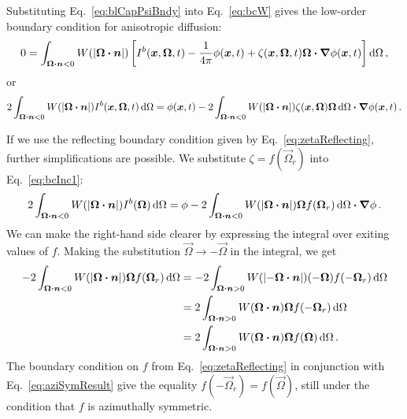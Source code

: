 Substituting Eq.~\eqref{eq:blCapPsiBndy} into Eq.~\eqref{eq:bcW} gives the
low-order boundary condition for anisotropic diffusion:
\begin{equation*}
  0 = \int_{\bm{\Omega} \bm{\cdot} \bm{n} < 0} W(\left| \bm{\Omega} \bm{\cdot} \bm{n} \right|)
  \left[  I^b(\bm{x}, \bm{\Omega}, t) - \frac{1}{4\pi} \phi(\bm{x}, t)
  + \zeta(\bm{x}, \bm{\Omega}, t) \bm{\Omega}\bm{\cdot} \bm{\nabla} \phi(\bm{x}, t)
\right] \mathop{}\!\mathrm{d} \Omega \,,
\end{equation*}
or
\begin{equation} \label{eq:bcInc1}
  2\int_{\bm{\Omega}\bm{\cdot} \bm{n} < 0}
  W(\left| \bm{\Omega} \bm{\cdot} \bm{n} \right|) I^b(\bm{x}, \bm{\Omega}, t) \mathop{}\!\mathrm{d}\Omega
  = \phi(\bm{x}, t)
  - 2\int_{\bm{\Omega}\bm{\cdot} \bm{n} < 0} W(\left| \bm{\Omega} \bm{\cdot} \bm{n} \right|)
  \zeta(\bm{x}, \bm{\Omega}) \bm{\Omega} \mathop{}\!\mathrm{d}\Omega
  \bm{\cdot} \bm{\nabla} \phi(\bm{x}, t) \,.
\end{equation}

If we use the reflecting boundary condition given by
Eq.~\eqref{eq:zetaReflecting}, further simplifications are possible. We
substitute $\zeta = f(\vec{\Omega}_r)$ into Eq.~\eqref{eq:bcInc1}:
\begin{equation*}
  2\int_{\bm{\Omega}\bm{\cdot} \bm{n} < 0}
  W(\left| \bm{\Omega} \bm{\cdot} \bm{n} \right|) I^b(\bm{\Omega}) \mathop{}\!\mathrm{d}\Omega
  = \phi
  - 2\int_{\bm{\Omega}\bm{\cdot} \bm{n} < 0} W(\left| \bm{\Omega} \bm{\cdot} \bm{n} \right|)
  \bm{\Omega} f(\bm{\Omega}_r) \mathop{}\!\mathrm{d}\Omega
  \bm{\cdot} \bm{\nabla} \phi \,.
\end{equation*}
We can make the right-hand side clearer by expressing the integral over exiting
values of $f$. Making the substitution $\vec{\Omega}\to-\vec{\Omega}$ in the
integral, we get
\begin{align*}
  - 2\int_{\bm{\Omega}\bm{\cdot} \bm{n} < 0} W(\left| \bm{\Omega} \bm{\cdot} \bm{n} \right|)
  \bm{\Omega} f(\bm{\Omega}_r) \mathop{}\!\mathrm{d}\Omega
  &= 
  - 2\int_{\bm{\Omega}\bm{\cdot} \bm{n} > 0} W(\left| -\bm{\Omega} \bm{\cdot} \bm{n} \right|)
  ( - \bm{\Omega}) f(-\bm{\Omega}_r) \mathop{}\!\mathrm{d}\Omega
  \\
  &= 
  2\int_{\bm{\Omega}\bm{\cdot} \bm{n} > 0} W(\bm{\Omega} \bm{\cdot} \bm{n})
  \bm{\Omega} f(-\bm{\Omega}_r) \mathop{}\!\mathrm{d}\Omega
  \\ 
  &= 
  2\int_{\bm{\Omega}\bm{\cdot} \bm{n} > 0} W(\bm{\Omega} \bm{\cdot} \bm{n})
  \bm{\Omega} f(\bm{\Omega}) \mathop{}\!\mathrm{d}\Omega \,.
\end{align*}
The boundary condition on $f$ from Eq.~\eqref{eq:zetaReflecting} in conjunction
with Eq.~\eqref{eq:aziSymResult} give the equality $f(-\vec{\Omega}_r) =
f(\vec{\Omega})$, still under the condition that $f$ is azimuthally symmetric.

